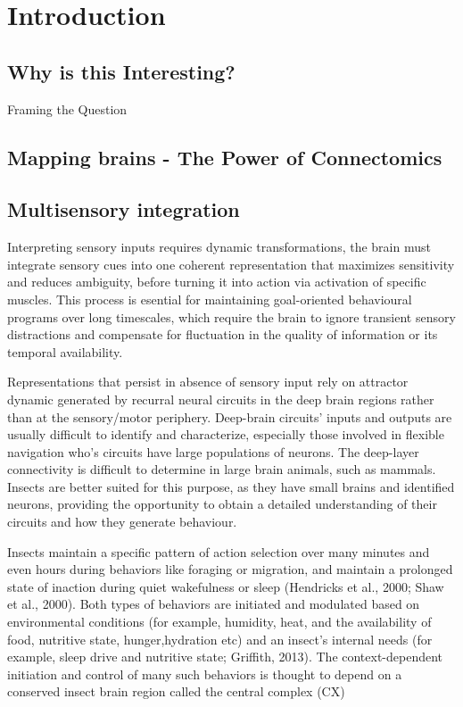 
\chapter{Introduction}  



\section{Why is this Interesting?} 
\label{section1.1}
Framing the Question
\section{Mapping brains - The Power of Connectomics} 


\section{Multisensory integration} 

Interpreting sensory inputs requires dynamic transformations, the brain must integrate sensory cues into one coherent representation that maximizes sensitivity and reduces ambiguity, before turning it into action via
activation of specific muscles. This process is esential for maintaining goal-oriented behavioural programs over long timescales, which require the brain to ignore transient sensory distractions and compensate for fluctuation in the quality of information or its temporal availability.

Representations that persist in absence of sensory input rely on attractor dynamic generated by recurral neural circuits in the deep brain regions rather than at the sensory/motor periphery. Deep-brain circuits' inputs and outputs are usually difficult to identify and characterize, especially those involved in flexible navigation who's circuits have large populations of neurons.
The deep-layer connectivity is difficult to determine in large brain animals, such as mammals. Insects are better suited for this purpose, as they have small brains and identified neurons, providing the opportunity to obtain a detailed understanding of their circuits and how they generate behaviour. 

Insects maintain a specific pattern of action selection over many minutes and even hours during behaviors like foraging or migration, and maintain a prolonged state of inaction during quiet wakefulness or sleep (Hendricks et al., 2000; Shaw et al., 2000). Both types of behaviors are initiated and modulated based on environmental conditions (for example, humidity, heat, and the availability of food, nutritive state, hunger,hydration etc) and an insect’s internal needs (for example, sleep drive and nutritive state; Griffith, 2013). The context-dependent initiation and control of many such behaviors is thought to depend on a conserved insect brain region called the central complex (CX)



